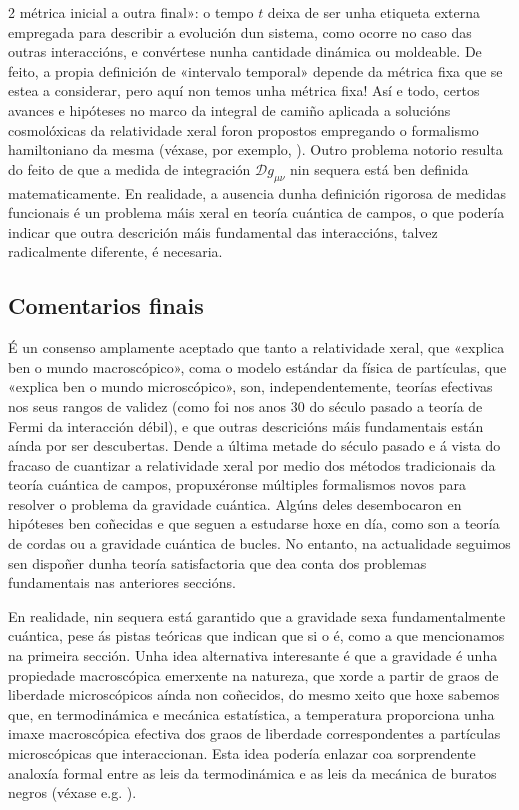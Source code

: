 \begin{multicols}{2}
métrica inicial a outra final»: o tempo $t$ deixa de ser unha etiqueta externa
empregada para describir a evolución dun sistema, como ocorre no caso das
outras interaccións, e convértese nunha cantidade dinámica ou moldeable. De
feito, a propia definición de «intervalo temporal» depende da métrica fixa que
se estea a considerar, pero aquí non temos unha métrica fixa! Así e todo,
certos avances e hipóteses no marco da integral de camiño aplicada a solucións
cosmolóxicas da relatividade xeral foron propostos empregando o formalismo
hamiltoniano da mesma (véxase, por exemplo, \cite{HH}). Outro problema notorio
resulta do feito de que a medida de integración $\mathcal{D} g_{\mu \nu}$ nin
sequera está ben definida matematicamente. En realidade, a ausencia dunha
definición rigorosa de medidas funcionais é un problema máis xeral en teoría
cuántica de campos, o que podería indicar que outra descrición máis fundamental
das interaccións, talvez radicalmente diferente, é necesaria.

\subsection*{Comentarios finais}

É un consenso amplamente aceptado que tanto a relatividade xeral, que «explica
ben o mundo macroscópico», coma o modelo estándar da física de partículas, que
«explica ben o mundo microscópico», son, independentemente, teorías efectivas
nos seus rangos de validez (como foi nos anos 30 do século pasado a teoría de
Fermi da interacción débil), e que outras descricións máis fundamentais están
aínda por ser descubertas. Dende a última metade do século pasado e á vista do
fracaso de cuantizar a relatividade xeral por medio dos métodos tradicionais da
teoría cuántica de campos, propuxéronse múltiples formalismos novos para
resolver o problema da gravidade cuántica. Algúns deles desembocaron en
hipóteses ben coñecidas e que seguen a estudarse hoxe en día, como son a teoría de %
cordas ou a gravidade cuántica de bucles. No entanto, na actualidade seguimos
sen dispoñer dunha teoría satisfactoria que dea conta dos problemas
fundamentais nas anteriores seccións.

En realidade, nin sequera está garantido que a gravidade sexa
fundamentalmente cuántica, pese ás pistas teóricas que indican que si o é, como
a que mencionamos na primeira sección. Unha idea alternativa interesante é que
a gravidade é unha propiedade macroscópica emerxente na natureza, que xorde a
partir de graos de liberdade microscópicos aínda non coñecidos, do mesmo
xeito que hoxe sabemos que, en termodinámica e mecánica estatística, a
temperatura proporciona unha imaxe macroscópica efectiva dos graos de liberdade
correspondentes a partículas microscópicas que interaccionan. Esta idea podería
enlazar coa sorprendente analoxía formal entre as leis da termodinámica e as
leis da mecánica de buratos negros (véxase e.g. \cite{BHT}).


\end{multicols}
